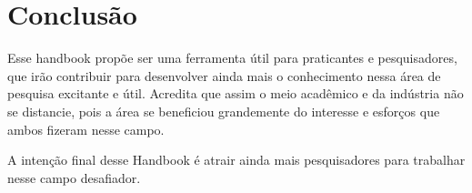 \section{Conclusão}

Esse handbook propõe ser uma ferramenta útil para praticantes e pesquisadores, que irão contribuir para desenvolver ainda mais o conhecimento nessa área de pesquisa excitante e útil. Acredita que assim o meio acadêmico e da indústria não se distancie, pois a área se beneficiou grandemente do interesse e esforços que ambos fizeram nesse campo.
\par
A intenção final desse Handbook é atrair ainda mais pesquisadores para trabalhar nesse campo desafiador.
